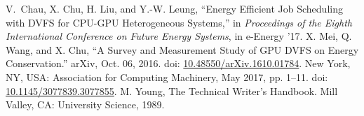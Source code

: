 \begin{thebibliography}{00}
     V. Chau, X. Chu, H. Liu, and Y.-W. Leung,
“Energy Efficient Job Scheduling with DVFS for CPU-GPU Heterogeneous Systems,”
in \textit{Proceedings of the Eighth International Conference on Future Energy Systems}, in e-Energy ’17.
 X. Mei, Q. Wang, and X. Chu, ``A Survey and Measurement Study of GPU DVFS on Energy Conservation.'' arXiv, Oct. 06, 2016. doi: \href{https://doi.org/10.48550/arXiv.1610.01784}{10.48550/arXiv.1610.01784}.
New York, NY, USA: Association for Computing Machinery, May 2017, pp. 1–11.
doi: \href{https://doi.org/10.1145/3077839.3077855}{10.1145/3077839.3077855}.
     M. Young, The Technical Writer's Handbook. Mill Valley, CA: University Science, 1989.
\end{thebibliography}
